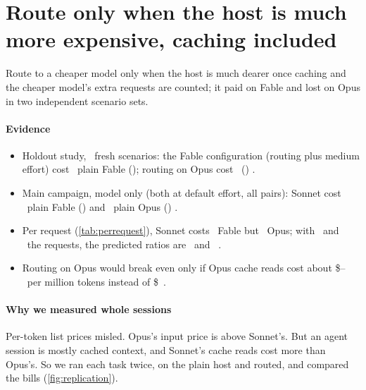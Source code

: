 \section{Route only when the host is much more expensive, caching included}\label{sec:routing}

\begin{claimbox}
Route to a cheaper model only when the host is much dearer once caching and the cheaper model's extra requests are counted; it paid on Fable and lost on Opus in two independent scenario sets.
\end{claimbox}

\paragraph{Evidence}
\begin{itemize}[leftmargin=1.2em]
  \item Holdout study, \SOnePanelN\ fresh scenarios: the Fable configuration (routing plus medium effort) cost
    \SHOneRatio\X\ plain Fable (\SHOneCI); routing on Opus cost \SHFiveRatio\X\ (\SHFiveCI) \prereg.
  \item Main campaign, model only (both at default effort, all pairs): Sonnet cost \CfFableSonnetArm\X\ plain Fable
    (\CfFableSonnetArmCIThree) and \CfOpusSonnetArm\X\ plain Opus (\CfOpusSonnetArmCIThree) \confpost.
  \item Per request (\cref{tab:perrequest}), Sonnet costs \RqSonnetOverFable\X\ Fable but \RqSonnetOverOpus\X\ Opus; with
    \RpMultFable\X\ and \RpMultOpus\X\ the requests, the predicted ratios are \RqPredFable\ and \RqPredOpus\ \expl.
  \item Routing on Opus would break even only if Opus cache reads cost about \$\BEStickyArm--\BEStickyPair\ per million tokens instead
    of \$\PriceOpusRead\ \expl.
\end{itemize}

\paragraph{Why we measured whole sessions} Per-token list prices misled. Opus's input price is above Sonnet's. But an
agent session is mostly cached context, and Sonnet's cache reads cost more than Opus's. So we ran each task twice, on
the plain host and routed, and compared the bills (\cref{fig:replication}).

\begin{table}[tbp]
\centering\small
\caption{Sonnet costs half as much as Fable per request, but as much as Opus. Cost of one average plain-host request
at list prices, its composition, and the routing ratio predicted from the per-request price and the measured request
multiplier \expl.}
\label{tab:perrequest}

\end{table}

